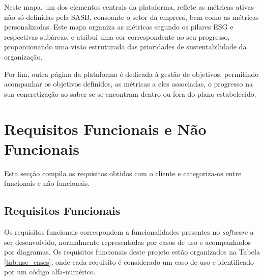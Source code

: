 Neste mapa, um dos elementos centrais da plataforma, reflete as métricas ativas não só definidas pela \gls{SASB}, consoante o setor da empresa, bem como as métricas personalizadas. Este mapa organiza as métricas segundo os pilares ESG e respectivas subáreas, e atribui uma cor correspondente ao seu progresso, proporcionando uma visão estruturada das prioridades de sustentabilidade da organização.

Por fim, outra página da plataforma é dedicada à gestão de objetivos, permitindo acompanhar os objetivos definidos, as métricas a eles associadas, o progresso na sua concretização ao saber se se encontram dentro ou fora do plano estabelecido.

\section{Requisitos Funcionais e Não Funcionais}

Esta secção compila os requisitos obtidos com o cliente e categoriza-os entre funcionais e não funcionais.

\subsection{Requisitos Funcionais}
\label{subsec:FunReq}

Os requisitos funcionais correspondem a funcionalidades presentes no \textit{software} a ser desenvolvido, normalmente representadas por casos de uso e acompanhados por diagramas. Os requisitos funcionais deste projeto estão organizados na Tabela \ref{tab:use_cases}, onde cada requisito é considerado um caso de uso e identificado por um código alfa-numérico.

